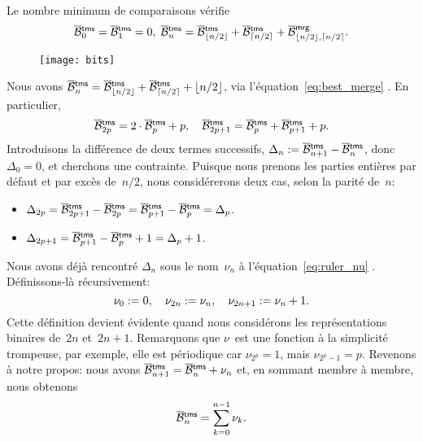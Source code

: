 Le nombre minimum de comparaisons vérifie
\begin{equation*}
\OB{\fun{tms}}{0} = \OB{\fun{tms}}{1} = 0,
\;
\OB{\fun{tms}}{n} = \OB{\fun{tms}}{\floor{n/2}}
+ \OB{\fun{tms}}{\ceiling{n/2}}
+ \OB{\fun{mrg}}{\floor{n/2},\ceiling{n/2}}.
\index{mrg@\fun{mrg/2}}
\index{tms@$\OB{\fun{tms}}{n}$}
\end{equation*}
%
{\setlength{\intextsep}{0pt} %
\begin{wrapfigure}[23]{r}[0pt]{0pt}
\centering
\texttt{[image: bits]}
\caption{}
\label{fig:bits}
\end{wrapfigure}
Nous avons \(\OB{\fun{tms}}{n} = \OB{\fun{tms}}{\floor{n/2}} +
\OB{\fun{tms}}{\ceiling{n/2}} +
\floor{n/2}\), via
l'équation~\eqref{eq:best_merge} .
En particulier,
\begin{equation*}
\OB{\fun{tms}}{2p} = 2 \cdot \OB{\fun{tms}}{p} + p,\quad
\OB{\fun{tms}}{2p+1} = \OB{\fun{tms}}{p} + \OB{\fun{tms}}{p+1} + p.
\end{equation*}
Introduisons la différence de deux termes successifs, \(\Delta_n :=
\OB{\fun{tms}}{n+1} - \OB{\fun{tms}}{n}\), donc \(\Delta_0 = 0\), et
cherchons une contrainte. Puisque nous prenons les parties entières
par défaut et par excès de~\(n/2\), nous considérerons deux cas, selon
la parité de~\(n\):
\begin{itemize}

 \item \(\Delta_{2p} = \OB{\fun{tms}}{2p+1} - \OB{\fun{tms}}{2p} =
  \OB{\fun{tms}}{p+1} - \OB{\fun{tms}}{p} = \Delta_{p}\).

  \item \(\Delta_{2p+1} = \OB{\fun{tms}}{p+1} - \OB{\fun{tms}}{p} + 1 =
  \Delta_{p} + 1\).

\end{itemize}
Nous avons déjà rencontré \(\Delta_n\) sous le nom~\(\nu_n\) à
l'équation~\eqref{eq:ruler_nu} . Définissons-là
récursivement:
\begin{equation}
\nu_{0} := 0,\quad \nu_{2n} := \nu_{n},\quad
\nu_{2n+1} := \nu_{n} + 1.\label{def:nu}\index{somme des bits}
\end{equation}
Cette définition devient évidente quand nous considérons les
représentations binaires de~\(2n\) et~\(2n+1\). Remarquons que
\(\nu\)~est une fonction à la simplicité trompeuse, par exemple, elle
est périodique car \(\nu_{2^p} = 1\), mais
\(\nu_{2^p-1}=p\). Revenons à notre propos: nous avons
\(\OB{\fun{tms}}{n+1} = \OB{\fun{tms}}{n} + \nu_n\) et, en sommant
membre à membre, nous obtenons
\begin{equation}
\abovedisplayskip=6pt
\abovedisplayshortskip=6pt
\belowdisplayskip=2pt
\OB{\fun{tms}}{n} = \sum_{k=0}^{n-1}{\nu_k}.\label{eq:OB_tms}
\index{tms@$\OB{\fun{tms}}{n}$}
\end{equation}}

